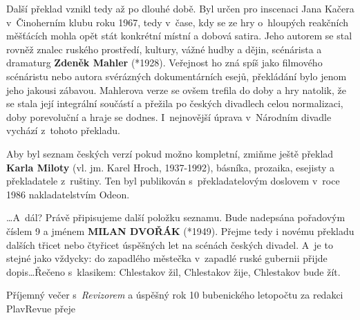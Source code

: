 Další překlad vznikl tedy až po dlouhé době. Byl určen pro inscenaci Jana Kačera v Činoherním klubu roku 1967, tedy v~čase, kdy se ze hry o~hloupých reakčních měšťácích mohla opět stát konkrétní místní a dobová satira. Jeho autorem se stal rovněž znalec ruského prostředí, kultury, vážné hudby a dějin, scénárista a dramaturg \textbf{Zdeněk Mahler} (*1928). Veřejnost ho zná spíš jako filmového scénáristu nebo autora svérázných dokumentárních esejů, překládání bylo jenom jeho jakousi zábavou. Mahlerova verze se ovšem trefila do doby a hry natolik, že se stala její integrální součástí a přežila po českých divadlech celou normalizaci, doby porevoluční a hraje se dodnes. I~nejnovější úprava v Národním divadle vychází z tohoto překladu.

Aby byl seznam českých verzí pokud možno kompletní, zmiňme ještě překlad \textbf{Karla Miloty} (vl. jm. Karel Hroch, 1937-1992), básníka, prozaika, esejisty a překladatele z ruštiny. Ten byl publikován s překladatelovým doslovem v roce 1986 nakladatelstvím Odeon.

\ldots A~dál? Právě připisujeme další položku seznamu. Bude nadepsána pořadovým číslem 9 a jménem \textbf{MILAN DVOŘÁK} (*1949). Přejme tedy i novému překladu dalších třicet nebo čtyřicet úspěšných let na scénách českých divadel. A~je to stejné jako vždycky: do zapadlého městečka v zapadlé ruské gubernii přijde dopis\ldots Řečeno s~klasikem: Chlestakov žil, Chlestakov žije, Chlestakov bude žít.

Příjemný večer s \textit{Revizorem} a úspěšný rok 10 bubenického letopočtu za redakci PlavRevue přeje



\pagebreak

\vspace*{24cm}











